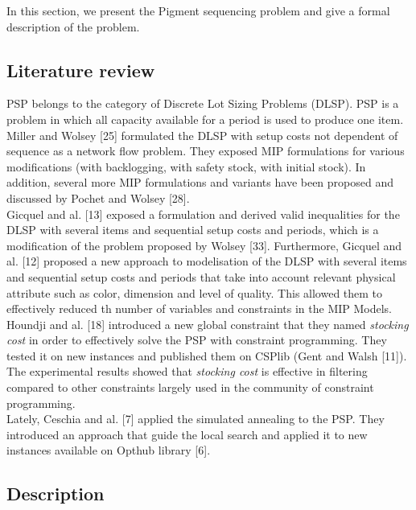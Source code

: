 \documentclass[twocolumn,10pt]{asme2ej}
\begin{document}
In this section, we present the Pigment sequencing problem and give a formal description of the problem.

\subsection{Literature review}

PSP belongs to the category of Discrete Lot Sizing Problems (DLSP). PSP is a problem in which all capacity available for a period is used to produce one item.\\
Miller and Wolsey [25] formulated the DLSP with setup costs not dependent of sequence as a network flow problem. They exposed MIP formulations for various modifications (with backlogging, with safety stock, with initial stock). In addition, several more MIP formulations and variants have been proposed and discussed by Pochet and Wolsey [28]. \\
Gicquel and al. [13] exposed a formulation and derived valid inequalities for the DLSP with several items and sequential setup costs and periods, which is a modification of the problem proposed by Wolsey [33]. Furthermore, Gicquel and al. [12] proposed a new approach to modelisation of the DLSP with several items and sequential setup costs and periods that take into account relevant physical attribute such as color, dimension and level of quality. This allowed them to effectively reduced th number of variables and constraints in the MIP Models.
Houndji and al. [18] introduced a new global constraint that they named \emph{stocking cost}  in order to effectively solve the PSP with constraint programming. They tested it on new instances and published them on CSPlib (Gent and Walsh [11]). The experimental results showed that \emph{stocking cost} is effective in filtering compared to other constraints largely used in the community of constraint programming. \\
Lately, Ceschia and al. [7] applied the simulated annealing to the PSP. They introduced an approach that guide the local search and applied it to new instances available on  Opthub library [6].  

\subsection{Description}
\end{document}

